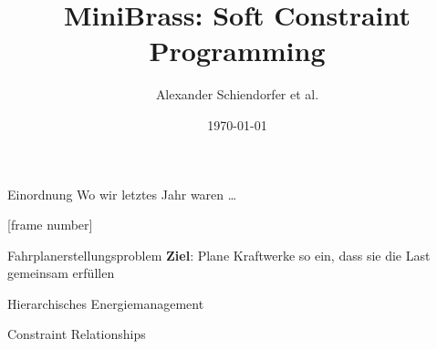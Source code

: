 \documentclass[handout,10pt,xcolor={dvipsnames},fleqn]{beamer}
\title{MiniBrass: Soft Constraint Programming}
\author{Alexander Schiendorfer et al.}
\date{\today}
\begin{document}
\titleframe

\begin{frame}{Einordnung}
Wo wir letztes Jahr waren \ldots 
\end{frame}


{

[frame number]{}



\begin{frame}{Fahrplanerstellungsproblem}
\textbf{Ziel}: Plane Kraftwerke so ein, dass sie die \alert{Last} gemeinsam erfüllen

\end{frame}
}


\begin{frame}{Hierarchisches Energiemanagement}

\begin{figure}
\centering

\label{fig:hierarchical-decomposition}
\end{figure}
\end{frame}


\begin{frame}{Constraint Relationships}
\begin{figure}
\centering

\end{figure}
\vspace*{-2.4ex}
\end{frame}
\end{document}
